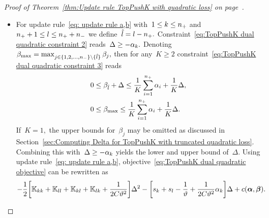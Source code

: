 \begin{proof}[Proof of Theorem~\ref{thm:Update rule TopPushK with quadratic loss} on page~\pageref{thm:Update rule TopPushK with quadratic loss}]
\begin{itemize}
    \item For update rule~\eqref{eq: update rule a,b} with~$1 \le k \le n_{+}$ and~$n_{+} + 1 \le l \le n_{+} + n_{-}$ we define~$\hat{l} = l - n_{+}.$ Constraint~\eqref{eq:TopPushK dual quadratic constraint 2} reads~$\Delta \geq - \alpha_k.$ Denoting~$\beta_{\max} = \max_{j \in \{1, 2, \ldots, n_{-} \} \setminus \{\hat{l}\}} \beta_j,$ then for any~$K \geq 2$ constraint~\eqref{eq:TopPushK dual quadratic constraint 3} reads
    \begin{equation}\label{eq: TopPushK dual quadratic a,b - bounds}
      \begin{aligned}
        0 & \leq \beta_{\hat{l}} + \Delta \leq \frac{1}{K} \sum_{i = 1}^{n_{+}} \alpha_i + \frac{1}{K} \Delta, \\
        0 & \leq \beta_{\max} \leq \frac{1}{K} \sum_{i = 1}^{n_{+}} \alpha_i + \frac{1}{K} \Delta.
      \end{aligned}
    \end{equation}
    If~$K = 1,$ the upper bounds for~$\beta_j$ may be omitted as discussed in Section~\ref{sec:Computing Delta for TopPushK with truncated quadratic loss}. Combining this with~$\Delta \geq - \alpha_k$ yields the lower and upper bound of~$\Delta.$ Using update rule~\eqref{eq: update rule a,b}, objective~\eqref{eq:TopPushK dual quadratic objective} can be rewritten as
    \begin{equation*}
      - \frac{1}{2} \Brac[s]{\K_{kk} + \K_{ll} + \K_{kl} + \K_{lk} + \frac{1}{2C\vartheta^2}} \Delta^2 - \Brac[s]{s_k + s_l - \frac{1}{\vartheta} + \frac{1}{2C\vartheta^2} \alphak} \Delta + c(\bm{\alpha}, \bm{\beta}).
    \end{equation*}


\end{itemize}
\end{proof}
